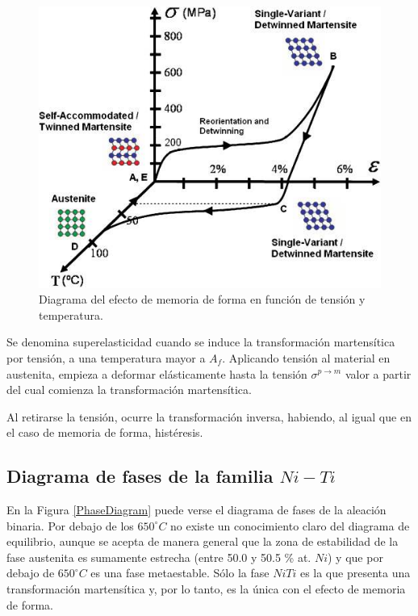 \documentclass[12pt]{article}
\theoremstyle{definition}
\theoremstyle{remark}
\begin{document}
\begin{figure}[H]
	\centering
	\includegraphics[scale=0.5]{img/3dCycle.png}
	\caption{Diagrama del efecto de memoria de forma en función de tensión y temperatura.}
	\label{3DGraph}
\end{figure}


Se denomina superelasticidad cuando se induce la transformación martensítica por tensión, a una temperatura mayor a $A_f$. Aplicando tensión al material en austenita, empieza a deformar elásticamente hasta la tensión $\sigma^{p \rightarrow m}$ valor a partir del cual comienza la transformación martensítica.

Al retirarse la tensión, ocurre la transformación inversa, habiendo, al igual que en el caso de memoria de forma, histéresis.


\subsection{Diagrama de fases de la familia $Ni-Ti$}
\label{PhaseDiagramSection}

En la Figura \ref{PhaseDiagram} puede verse el diagrama de fases de la aleación binaria. Por debajo de los $650 ^\circ C$ no existe un conocimiento claro del diagrama de equilibrio, aunque se acepta de manera general que la zona de estabilidad de la fase austenita es sumamente estrecha (entre 50.0 y 50.5 \% at. $Ni$) y que por debajo de $650^\circ C$ es una fase metaestable. Sólo la fase $NiTi$ es la que presenta una transformación martensítica y, por lo tanto, es la única con el efecto de memoria de forma.
\end{document}
